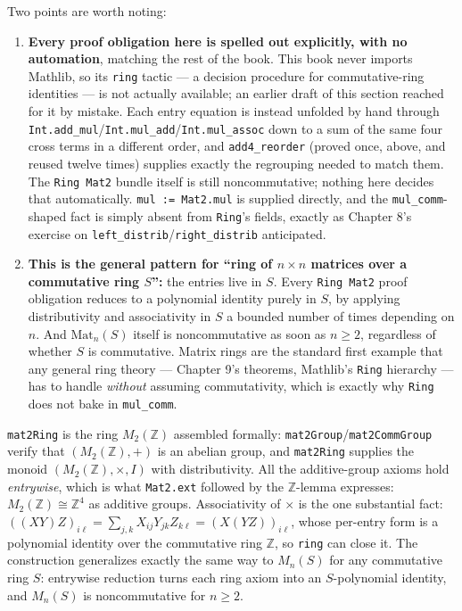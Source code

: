 Two points are worth noting:

\begin{enumerate}
\def\labelenumi{\arabic{enumi}.}
\tightlist
\item
  \textbf{Every proof obligation here is spelled out explicitly, with no automation}, matching the rest of the book. This book never imports Mathlib, so its \texttt{ring} tactic --- a decision procedure for commutative-ring identities --- is not actually available; an earlier draft of this section reached for it by mistake. Each entry equation is instead unfolded by hand through \texttt{Int.add\_\allowbreak{}mul}/\texttt{Int.mul\_\allowbreak{}add}/\texttt{Int.mul\_\allowbreak{}assoc} down to a sum of the same four cross terms in a different order, and \texttt{add4\_\allowbreak{}reorder} (proved once, above, and reused twelve times) supplies exactly the regrouping needed to match them. The \texttt{Ring Mat2} bundle itself is still noncommutative; nothing here decides that automatically. \texttt{mul := Mat2.mul} is supplied directly, and the \texttt{mul\_\allowbreak{}comm}-shaped fact is simply absent from \texttt{Ring}'s fields, exactly as Chapter 8's exercise on \texttt{left\_\allowbreak{}distrib}/\texttt{right\_\allowbreak{}distrib} anticipated.
\item
  \textbf{This is the general pattern for ``ring of \(n\times n\) matrices over a commutative ring \(S\)'':} the entries live in \(S\). Every \texttt{Ring Mat2} proof obligation reduces to a polynomial identity purely in \(S\), by applying distributivity and associativity in \(S\) a bounded number of times depending on \(n\). And \(\text{Mat}_n(S)\) itself is noncommutative as soon as \(n \geq 2\), regardless of whether \(S\) is commutative. Matrix rings are the standard first example that any general ring theory --- Chapter 9's theorems, Mathlib's \texttt{Ring} hierarchy --- has to handle \emph{without} assuming commutativity, which is exactly why \texttt{Ring} does not bake in \texttt{mul\_\allowbreak{}comm}.
\end{enumerate}

\begin{mathreading}

\texttt{mat2Ring} is the ring \(M_2(\mathbb{Z})\) assembled formally: \texttt{mat2Group}/\texttt{mat2CommGroup} verify that \((M_2(\mathbb{Z}), +)\) is an abelian group, and \texttt{mat2Ring} supplies the monoid \((M_2(\mathbb{Z}),
\times, I)\) with distributivity. All the additive-group axioms hold \emph{entrywise}, which is what \texttt{Mat2.ext} followed by the \(\mathbb{Z}\)-lemma expresses: \(M_2(\mathbb{Z}) \cong \mathbb{Z}^4\) as additive groups. Associativity of \(\times\) is the one substantial fact: \(((XY)Z)_{i\ell} = \sum_{j,k} X_{ij}Y_{jk}Z_{k\ell}
= (X(YZ))_{i\ell}\), whose per-entry form is a polynomial identity over the commutative ring \(\mathbb{Z}\), so \texttt{ring} can close it. The construction generalizes exactly the same way to \(M_n(S)\) for any commutative ring \(S\): entrywise reduction turns each ring axiom into an \(S\)-polynomial identity, and \(M_n(S)\) is noncommutative for \(n \ge 2\).

\end{mathreading}

